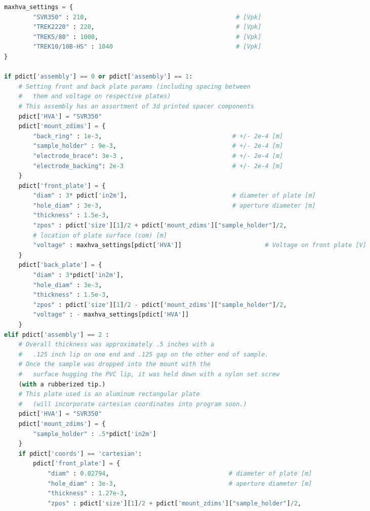 \begin{spacing}{1.2}
\begin{lstlisting}[frame=single, language=Python]
maxhva_settings = {
        "SVR350" : 210,                                         # [Vpk]
        "TREK2220" : 220,                                       # [Vpk]
        "TREK5/80" : 1000,                                      # [Vpk]
        "TREK10/10B-HS" : 1040                                  # [Vpk]
} 

if pdict['assembly'] == 0 or pdict['assembly'] == 1:
    # Setting front and back plate params (including spacing between
    # 	them and voltage on respective plates)
    # This assembly has an assortment of 3d printed spacer components
    pdict['HVA'] = "SVR350"
    pdict['mount_zdims'] = {
        "back_ring" : 1e-3,                                    # +/- 2e-4 [m]
        "sample_holder" : 9e-3,                                # +/- 2e-4 [m]
        "electrode_brace": 3e-3 ,                              # +/- 2e-4 [m]
        "electrode_backing": 2e-3                              # +/- 2e-4 [m]
    }
    pdict['front_plate'] = {
        "diam" : 3* pdict['in2m'],                             # diameter of plate [m]
        "hole_diam" : 3e-3,                                    # aperture diameter [m]
        "thickness" : 1.5e-3,
        "zpos" : pdict['size'][1]/2 + pdict['mount_zdims']["sample_holder"]/2,
	    # location of plate surface (com) [m]
        "voltage" : maxhva_settings[pdict['HVA']]                       # Voltage on front plate [V]
    }
    pdict['back_plate'] = {
        "diam" : 3*pdict['in2m'], 
        "hole_diam" : 3e-3,
        "thickness" : 1.5e-3, 
        "zpos" : pdict['size'][1]/2 - pdict['mount_zdims']["sample_holder"]/2,
        "voltage" : - maxhva_settings[pdict['HVA']]
    } 
elif pdict['assembly'] == 2 : 
    # Overall thickness was approximately .5 inches with a 
    #	.125 inch lip on one end and .125 gap on the other end of sample.
    # Once the sample was dropped into the mount with the 
    #	surface hugging the PVC lip, it was held down with a nylon set screw 
	(with a rubberized tip.)
    # This plate used is an aluminum rectangular plate 
    #	(will incorporate cartesian coordinates into program soon.)
    pdict['HVA'] = "SVR350"
    pdict['mount_zdims'] = {
        "sample_holder" : .5*pdict['in2m']
    }
    if pdict['coords'] == 'cartesian':
        pdict['front_plate'] = {
            "diam" : 0.02794,                                 # diameter of plate [m]
            "hole_diam" : 3e-3,                               # aperture diameter [m]
            "thickness" : 1.27e-3, 
            "zpos" : pdict['size'][1]/2 + pdict['mount_zdims']["sample_holder"]/2,    

\end{lstlisting}
\end{spacing}
